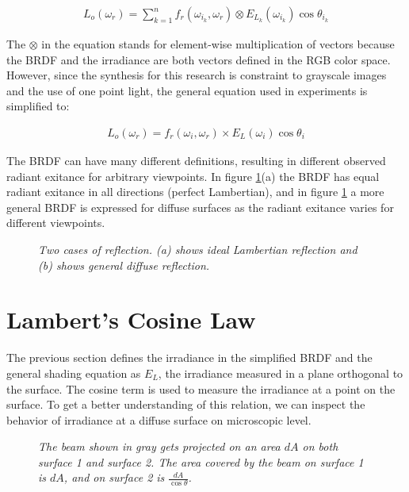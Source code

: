 		\begin{eqnarray*}
			L_o(\omega_r) = \sum_{k=1}^n f_r(\omega_{i_k}, \omega_r) \otimes E_{L_k}(\omega_{i_k})\cos\theta_{i_k}
		\end{eqnarray*}

\noindent The $\otimes$ in the equation stands for element-wise multiplication of vectors because the BRDF and the irradiance are both vectors defined in the RGB color space. However, since the synthesis for this research is constraint to grayscale images and the use of one point light, the general equation used in experiments is simplified to:

		\begin{eqnarray*}
			L_o(\omega_r) = f_r(\omega_{i}, \omega_r) \times E_{L}(\omega_{i})\cos\theta_{i}
		\end{eqnarray*}

The BRDF can have many different definitions, resulting in different observed radiant exitance for arbitrary viewpoints. In figure \ref{fig:BRDF}(a) the BRDF has equal radiant exitance in all directions (perfect Lambertian), and in figure \ref{fig:BRDF} a more general BRDF is expressed for diffuse surfaces as the radiant exitance varies for different viewpoints.

\begin{figure}[H]
	\begin{center}
	\end{center}
	\caption{{\it Two cases of reflection. (a) shows ideal Lambertian reflection and (b) shows general diffuse reflection.}}
	\label{fig:BRDF}
\end{figure}

\section{Lambert's Cosine Law}

The previous section defines the irradiance in the simplified BRDF and the general shading equation as $E_L$, the irradiance measured in a plane orthogonal to the surface. The cosine term is used to measure the irradiance at a point on the surface. To get a better understanding of this relation, we can inspect the behavior of irradiance at a diffuse surface on microscopic level.

\begin{figure}[H]
	\begin{center}
	\end{center}
	\caption{{\it The beam shown in gray gets projected on an area $dA$ on both surface 1 and surface 2. The area covered by the beam on surface 1 is $dA$, and on surface 2 is $\frac{dA}{\cos\theta}$. }}
	\label{fig:BEAM}
\end{figure}

